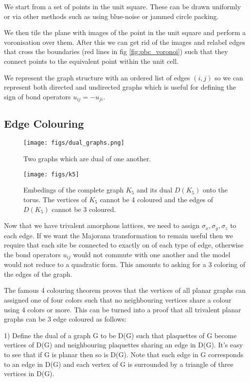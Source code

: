 We start from a set of points in the unit square. These can be drawn uniformly or via other methods such as using blue-noise or jammed circle packing. 

We then tile the plane with images of the point in the unit square and perform a voronisation over them. After this we can get rid of the images and relabel edges that cross the boundaries (red lines in fig \ref{fig:pbc_voronoi}) such that they connect points to the equivalent point within the unit cell.

We represent the graph structure with an ordered list of edges \((i,j)\) so we can represent both directed and undirected graphs which is useful for defining the sign of bond operators \(u_{ij} = - u_{ji}\).



\subsection{Edge Colouring}
\begin{figure}
    \centering
    \texttt{[image: figs/dual\_graphs.png]}
    \caption{Two graphs which are dual of one another.}
    \label{fig:dual_graphs}
\end{figure}

\begin{figure}
    \centering
    \texttt{[image: figs/k5]}
    \caption{Embedings of the complete graph \(K_5\) and its dual \(D(K_5)\) onto the torus. The vertices of \(K_5\) cannot be 4 coloured and the edges of \(D(K_5)\) cannot be 3 coloured.}
    \label{fig:k5}
\end{figure}

Now that we have trivalent amorphous lattices, we need to assign \(\sigma_x, \sigma_y, \sigma_z\) to each edge. If we want the Majorana transformation to remain useful then we require that each site be connected to exactly on of each type of edge, otherwise the bond operators \(u_{ij}\) would not commute with one another and the model would not reduce to a quadratic form. This amounts to asking for a 3 coloring of the edges of the graph. 

The famous 4 colouring theorem proves that the vertices of all planar graphs can assigned one of four colors such that no neighbouring vertices share a colour using 4 colors or more. This can be turned into a proof that all trivalent planar graphs can be 3 edge coloured as follows:

1) Define the dual of a graph G to be D(G) such that plaquettes of G become vertices of D(G) and neighbouring plaquettes sharing an edge in D(G). It's easy to see that if G is planar then so is D(G). Note that each edge in G corresponds to an edge in D(G) and each vertex of G is surrounded by a triangle of three vertices in D(G).

